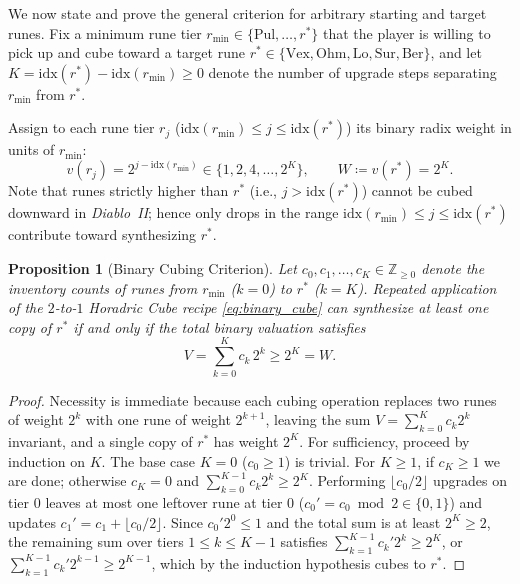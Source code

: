 \documentclass[11pt,reqno]{amsart}
\newtheorem{proposition}[theorem]{Proposition}
\theoremstyle{definition}
\begin{document}
We now state and prove the general criterion for arbitrary starting and target runes. Fix a minimum rune tier $r_{\min} \in \{\text{Pul}, \dots, r^*\}$ that the player is willing to pick up and cube toward a target rune $r^* \in \{\text{Vex}, \text{Ohm}, \text{Lo}, \text{Sur}, \text{Ber}\}$, and let $K = \text{idx}(r^*) - \text{idx}(r_{\min}) \ge 0$ denote the number of upgrade steps separating $r_{\min}$ from $r^*$.

Assign to each rune tier $r_j$ ($\text{idx}(r_{\min}) \le j \le \text{idx}(r^*)$) its binary radix weight in units of $r_{\min}$:
\begin{equation}
    v(r_j) = 2^{j - \text{idx}(r_{\min})} \in \{1, 2, 4, \dots, 2^K\}, \qquad W \coloneqq v(r^*) = 2^K.
\end{equation}
Note that runes strictly higher than $r^*$ (i.e., $j > \text{idx}(r^*)$) cannot be cubed downward in \emph{Diablo~II}; hence only drops in the range $\text{idx}(r_{\min}) \le j \le \text{idx}(r^*)$ contribute toward synthesizing $r^*$.

\begin{proposition}[Binary Cubing Criterion]
\label{prop:binary}
Let $c_0, c_1, \dots, c_K \in \mathbb{Z}_{\ge 0}$ denote the inventory counts of runes from $r_{\min}$ ($k=0$) to $r^*$ ($k=K$). Repeated application of the $2$-to-$1$ Horadric Cube recipe \eqref{eq:binary_cube} can synthesize at least one copy of $r^*$ if and only if the total binary valuation satisfies
\begin{equation}
\label{eq:valuation}
    V = \sum_{k=0}^{K} c_k\, 2^k \ge 2^K = W.
\end{equation}
\end{proposition}

\begin{proof}
Necessity is immediate because each cubing operation replaces two runes of weight $2^k$ with one rune of weight $2^{k+1}$, leaving the sum $V = \sum_{k=0}^K c_k 2^k$ invariant, and a single copy of $r^*$ has weight $2^K$. For sufficiency, proceed by induction on $K$. The base case $K=0$ ($c_0 \ge 1$) is trivial. For $K \ge 1$, if $c_K \ge 1$ we are done; otherwise $c_K = 0$ and $\sum_{k=0}^{K-1} c_k 2^k \ge 2^K$. Performing $\lfloor c_0 / 2 \rfloor$ upgrades on tier $0$ leaves at most one leftover rune at tier $0$ ($c_0' = c_0 \bmod 2 \in \{0, 1\}$) and updates $c_1' = c_1 + \lfloor c_0 / 2 \rfloor$. Since $c_0' 2^0 \le 1$ and the total sum is at least $2^K \ge 2$, the remaining sum over tiers $1 \le k \le K-1$ satisfies $\sum_{k=1}^{K-1} c_k' 2^k \ge 2^K$, or $\sum_{k=1}^{K-1} c_k' 2^{k-1} \ge 2^{K-1}$, which by the induction hypothesis cubes to $r^*$.
\end{proof}
\end{document}
